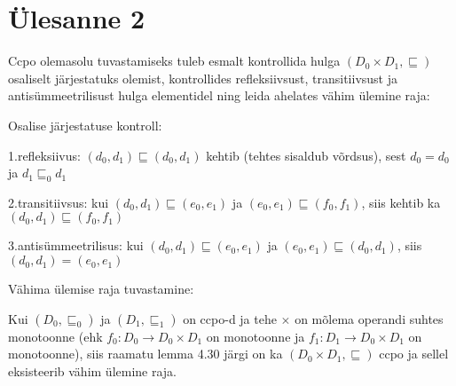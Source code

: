 \section{Ülesanne 2}

Ccpo olemasolu tuvastamiseks tuleb esmalt kontrollida hulga \((D_0 \times D_1,
\sqsubseteq )\) osaliselt järjestatuks olemist, kontrollides refleksiivsust,
transitiivsust ja antisümmeetrilisust hulga elementidel ning leida ahelates
vähim ülemine raja:

Osalise järjestatuse kontroll:

1.refleksiivus: \((d_0, d_1) \sqsubseteq (d_0, d_1)\) kehtib (tehtes sisaldub
võrdsus), sest \(d_0 = d_0\) ja \(d_1 \sqsubseteq_0 d_1 \)

2.transitiivsus: kui \((d_0, d_1) \sqsubseteq (e_0, e_1)\) ja \((e_0, e_1)
\sqsubseteq (f_0, f_1)\), siis kehtib ka \((d_0, d_1) \sqsubseteq (f_0, f_1)\)

3.antisümmeetrilisus: kui \((d_0, d_1) \sqsubseteq (e_0, e_1)\) ja \((e_0, e_1)
\sqsubseteq (d_0, d_1)\), siis \((d_0, d_1) = (e_0, e_1)\)

Vähima ülemise raja tuvastamine:

Kui \((D_0, \sqsubseteq_0)\) ja \((D_1, \sqsubseteq_1)\) on ccpo-d ja tehe
\(\times\) on mõlema operandi suhtes monotoonne (ehk \(f_0:D_0 \rightarrow D_0
\times D_1\) on monotoonne ja \(f_1:D_1 \rightarrow D_0 \times D_1\) on
monotoonne), siis raamatu lemma 4.30 järgi on ka \((D_0 \times D_1,
\sqsubseteq)\) ccpo ja sellel eksisteerib vähim ülemine raja.
